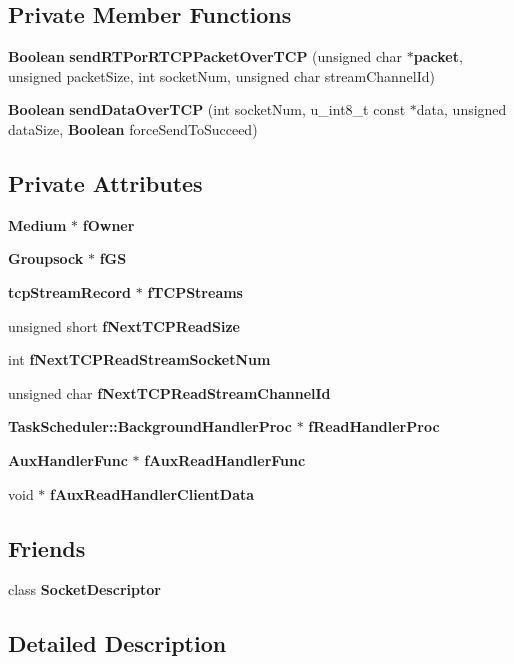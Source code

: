 \subsection*{Private Member Functions}
\begin{DoxyCompactItemize}
\item 
{\bf Boolean} {\bf send\+R\+T\+Por\+R\+T\+C\+P\+Packet\+Over\+T\+C\+P} (unsigned char $\ast${\bf packet}, unsigned packet\+Size, int socket\+Num, unsigned char stream\+Channel\+Id)
\item 
{\bf Boolean} {\bf send\+Data\+Over\+T\+C\+P} (int socket\+Num, u\+\_\+int8\+\_\+t const $\ast$data, unsigned data\+Size, {\bf Boolean} force\+Send\+To\+Succeed)
\end{DoxyCompactItemize}
\subsection*{Private Attributes}
\begin{DoxyCompactItemize}
\item 
{\bf Medium} $\ast$ {\bf f\+Owner}
\item 
{\bf Groupsock} $\ast$ {\bf f\+G\+S}
\item 
{\bf tcp\+Stream\+Record} $\ast$ {\bf f\+T\+C\+P\+Streams}
\item 
unsigned short {\bf f\+Next\+T\+C\+P\+Read\+Size}
\item 
int {\bf f\+Next\+T\+C\+P\+Read\+Stream\+Socket\+Num}
\item 
unsigned char {\bf f\+Next\+T\+C\+P\+Read\+Stream\+Channel\+Id}
\item 
{\bf Task\+Scheduler\+::\+Background\+Handler\+Proc} $\ast$ {\bf f\+Read\+Handler\+Proc}
\item 
{\bf Aux\+Handler\+Func} $\ast$ {\bf f\+Aux\+Read\+Handler\+Func}
\item 
void $\ast$ {\bf f\+Aux\+Read\+Handler\+Client\+Data}
\end{DoxyCompactItemize}
\subsection*{Friends}
\begin{DoxyCompactItemize}
\item 
class {\bf Socket\+Descriptor}
\end{DoxyCompactItemize}


\subsection{Detailed Description}


